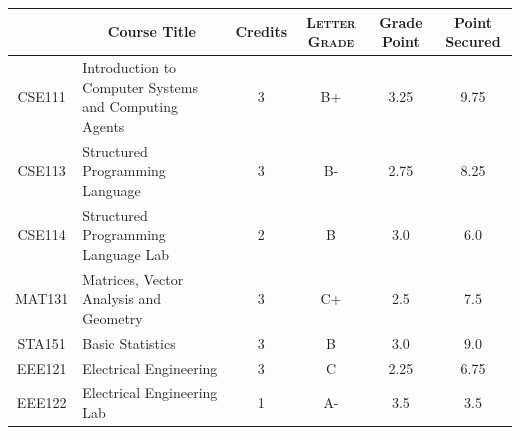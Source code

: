\documentclass[11pt]{article}
\newcommand*{\numtwo}[1]{\pgfmathprintnumber[
                    fixed, precision=2, fixed zerofill=true]{#1}}
\begin{document}
                \begin{center}
                    \renewcommand{\arraystretch}{1.08}
                    
                \begin{tabular}{|c|l|c|>{\scshape}c|c|c|}
                \hline  \rule[-1ex]{0pt}{3.5ex} {\centering{\bf Course Code}} &  \multicolumn{1}{c|}{\textbf{Course Title}}  & {\bf Credits} & {\bf Letter Grade} & {\bf Grade Point} & {\bf Point Secured}  \\ 
                \hline   CSE111 &  Introduction to Computer Systems and Computing Agents		 & 3 & B+ & 3.25 & 9.75 \\ %
                \hline   CSE113 &  Structured Programming Language		 & 3 & B- & 2.75 & 8.25 \\ %
                \hline   CSE114 &  Structured Programming Language Lab		 & 2 & B & 3.0 & 6.0 \\ %
                \hline   MAT131 &  Matrices, Vector Analysis and Geometry		 & 3 & C+ & 2.5 & 7.5 \\ %
                \hline   STA151 &  Basic Statistics		 & 3 & B & 3.0 & 9.0 \\ %
                \hline   EEE121 &  Electrical Engineering		 & 3 & C & 2.25 & 6.75 \\ %
                \hline   EEE122 &  Electrical Engineering Lab		 & 1 & A- & 3.5 & 3.5 \\ %

\hline                %
                \end{tabular}
                \end{center}
                \renewcommand{\arraystretch}{1.03}
\end{document}
